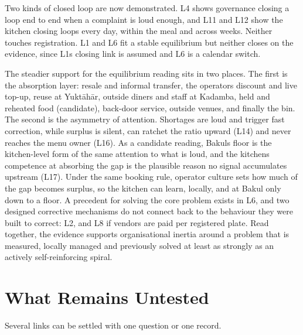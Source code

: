 \documentclass[
  10pt,
  table]{article}
\begin{document}
Two kinds of closed loop are now demonstrated. L4 shows governance closing a loop end to end when a complaint is loud enough, and L11 and L12 show the kitchen closing loops every day, within the meal and across weeks. Neither touches registration. L1 and L6 fit a stable equilibrium but neither closes on the evidence, since L1\textquotesingle s closing link is assumed and L6 is a calendar switch.

The steadier support for the equilibrium reading sits in two places. The first is the absorption layer: resale and informal transfer, the operator\textquotesingle s discount and live top-up, reuse at Yuktāhār, outside diners and staff at Kadamba, held and reheated food (candidate), back-door service, outside venues, and finally the bin. The second is the asymmetry of attention. Shortages are loud and trigger fast correction, while surplus is silent, can ratchet the ratio upward (L14) and never reaches the menu owner (L16). As a candidate reading, Bakul\textquotesingle s floor is the kitchen-level form of the same attention to what is loud, and the kitchen\textquotesingle s competence at absorbing the gap is the plausible reason no signal accumulates upstream (L17). Under the same booking rule, operator culture sets how much of the gap becomes surplus, so the kitchen can learn, locally, and at Bakul only down to a floor. A precedent for solving the core problem exists in L6, and two designed corrective mechanisms do not connect back to the behaviour they were built to correct: L2, and L8 if vendors are paid per registered plate. Read together, the evidence supports organisational inertia around a problem that is measured, locally managed and previously solved at least as strongly as an actively self-reinforcing spiral.

\section{What Remains Untested}\label{what-remains-untested}

Several links can be settled with one question or one record.
\end{document}

